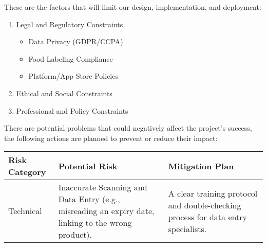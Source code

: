 These are the factors that will limit our design, implementation, and deployment:
\begin{enumerate}

\item Legal and Regulatory Constraints

\begin{itemize}

\item Data Privacy (GDPR/CCPA)

\item Food Labeling Compliance

\item Platform/App Store Policies

\end{itemize}

\item Ethical and Social Constraints

\item Professional and Policy Constraints

\end{enumerate}

\par

There are potential problems that could negatively affect the project's success, the following actions are planned to prevent or reduce their impact:

\begin{center}
\begin{tabular}{| p{2cm} | p{5cm} | p{5cm} |}
    \hline
    \textbf{Risk Category} & \textbf{Potential Risk} & \textbf{Mitigation Plan} \\
    \hline
    Technical & Inaccurate Scanning and Data Entry (e.g., misreading an expiry date, linking to the wrong product). & A clear training protocol and double-checking process for data entry specialists. \\
    \hline
\end{tabular}
\end{center}
